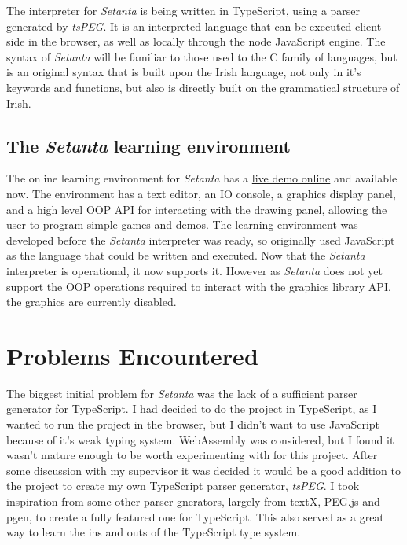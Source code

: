 \documentclass[11pt]{extarticle}
\newcommand{\Setanta}{\emph{Setanta}}
\newcommand{\tsPEG}{\emph{tsPEG}}
\begin{document}
            The interpreter for \Setanta{} is being written in TypeScript, using a parser generated by \tsPEG{}.
            It is an interpreted language that can be executed client-side in the browser, as well as locally through the node JavaScript engine.
            The syntax of \Setanta{} will be familiar to those used to the C family of languages, but is an original syntax that is built upon the Irish language, not only in it's keywords and functions, but also is directly built on the grammatical structure of Irish.

        \subsection{The \Setanta{} learning environment}

        The online learning environment for \Setanta{} has a \href{https://vey.ie/goto?go=fyp}{live demo online} and available now. The environment has a text editor, an IO console, a graphics display panel, and a high level OOP API for interacting with the drawing panel, allowing the user to program simple games and demos.
        The learning environment was developed before the \Setanta{} interpreter was ready, so originally used JavaScript as the language that could be written and executed. Now that the \Setanta{} interpreter is operational, it now supports it. However as \Setanta{} does not yet support the OOP operations required to interact with the graphics library API, the graphics are currently disabled.

    \section{Problems Encountered}

    The biggest initial problem for \Setanta{} was the lack of a sufficient parser generator for TypeScript. I had decided to do the project in TypeScript, as I wanted to run the project in the browser, but I didn't want to use JavaScript because of it's weak typing system. WebAssembly was considered, but I found it wasn't mature enough to be worth experimenting with for this project.
    After some discussion with my supervisor it was decided it would be a good addition to the project to create my own TypeScript parser generator, \tsPEG{}. I took inspiration from some other parser gnerators, largely from textX, PEG.js and pgen, to create a fully featured one for TypeScript. This also served as a great way to learn the ins and outs of the TypeScript type system.
\end{document}
